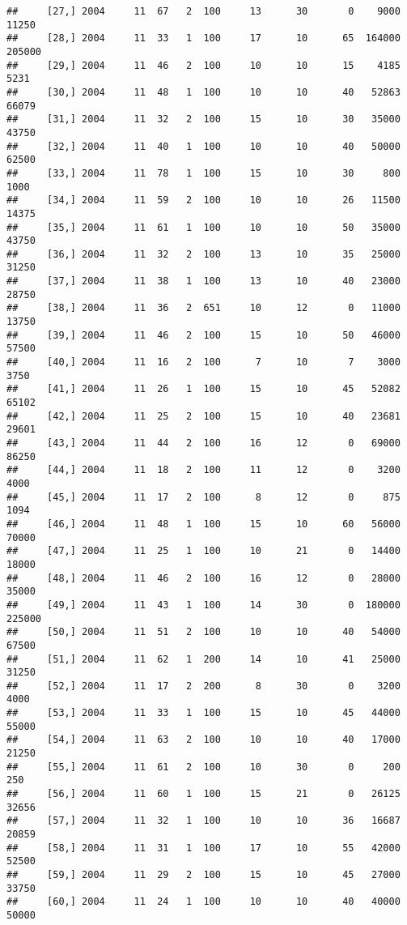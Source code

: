 \documentclass{article}\usepackage[]{graphicx}\usepackage[]{color}
\makeatletter
\newenvironment{kframe}{%
 \def\at@end@of@kframe{}%
 \ifinner\ifhmode%
  \def\at@end@of@kframe{\end{minipage}}%
  \begin{minipage}{\columnwidth}%
 \fi\fi%
 \def\FrameCommand##1{\hskip\@totalleftmargin \hskip-\fboxsep
 \colorbox{shadecolor}{##1}\hskip-\fboxsep
     \hskip-\linewidth \hskip-\@totalleftmargin \hskip\columnwidth}%
 \MakeFramed {\advance\hsize-\width
   \@totalleftmargin\z@ \linewidth\hsize
   \@setminipage}}%
 {\par\unskip\endMakeFramed%
 \at@end@of@kframe}
\newenvironment{knitrout}{}{} %
\makeatother
\begin{document}
\begin{knitrout}
\begin{kframe}
\begin{verbatim}
##     [27,] 2004     11  67   2  100     13      30       0    9000   11250
##     [28,] 2004     11  33   1  100     17      10      65  164000  205000
##     [29,] 2004     11  46   2  100     10      10      15    4185    5231
##     [30,] 2004     11  48   1  100     10      10      40   52863   66079
##     [31,] 2004     11  32   2  100     15      10      30   35000   43750
##     [32,] 2004     11  40   1  100     10      10      40   50000   62500
##     [33,] 2004     11  78   1  100     15      10      30     800    1000
##     [34,] 2004     11  59   2  100     10      10      26   11500   14375
##     [35,] 2004     11  61   1  100     10      10      50   35000   43750
##     [36,] 2004     11  32   2  100     13      10      35   25000   31250
##     [37,] 2004     11  38   1  100     13      10      40   23000   28750
##     [38,] 2004     11  36   2  651     10      12       0   11000   13750
##     [39,] 2004     11  46   2  100     15      10      50   46000   57500
##     [40,] 2004     11  16   2  100      7      10       7    3000    3750
##     [41,] 2004     11  26   1  100     15      10      45   52082   65102
##     [42,] 2004     11  25   2  100     15      10      40   23681   29601
##     [43,] 2004     11  44   2  100     16      12       0   69000   86250
##     [44,] 2004     11  18   2  100     11      12       0    3200    4000
##     [45,] 2004     11  17   2  100      8      12       0     875    1094
##     [46,] 2004     11  48   1  100     15      10      60   56000   70000
##     [47,] 2004     11  25   1  100     10      21       0   14400   18000
##     [48,] 2004     11  46   2  100     16      12       0   28000   35000
##     [49,] 2004     11  43   1  100     14      30       0  180000  225000
##     [50,] 2004     11  51   2  100     10      10      40   54000   67500
##     [51,] 2004     11  62   1  200     14      10      41   25000   31250
##     [52,] 2004     11  17   2  200      8      30       0    3200    4000
##     [53,] 2004     11  33   1  100     15      10      45   44000   55000
##     [54,] 2004     11  63   2  100     10      10      40   17000   21250
##     [55,] 2004     11  61   2  100     10      30       0     200     250
##     [56,] 2004     11  60   1  100     15      21       0   26125   32656
##     [57,] 2004     11  32   1  100     10      10      36   16687   20859
##     [58,] 2004     11  31   1  100     17      10      55   42000   52500
##     [59,] 2004     11  29   2  100     15      10      45   27000   33750
##     [60,] 2004     11  24   1  100     10      10      40   40000   50000

\end{verbatim}
\end{kframe}
\end{knitrout}
\end{document}
